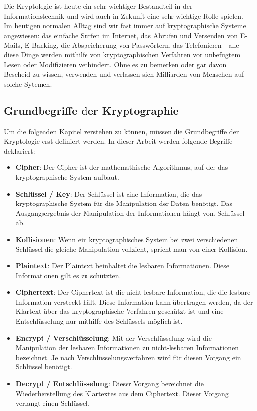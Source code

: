 \documentclass[12pt,a4paper]{report}
\begin{document}
\begin{onehalfspace}
Die Kryptologie ist heute ein sehr wichtiger Bestandteil in der Informationstechnik und wird auch in Zukunft eine sehr wichtige Rolle spielen. Im heutigen normalen Alltag sind wir fast immer auf kryptographische Systeme angewiesen: das einfache Surfen im Internet, das Abrufen und Versenden von E-Mails, E-Banking, die Abspeicherung von Passwörtern, das Telefonieren - alle diese Dinge werden mithilfe von kryptographischen Verfahren vor unbefugtem Lesen oder Modifizieren verhindert. Ohne es zu bemerken oder gar davon Bescheid zu wissen, verwenden und verlassen sich Milliarden von Menschen auf solche Sytemen.

\subsection{Grundbegriffe der Kryptographie}

Um die folgenden Kapitel verstehen zu können, müssen die Grundbegriffe der Kryptologie erst definiert werden. In dieser Arbeit werden folgende Begriffe deklariert:

\begin{itemize}
\item \textbf{Cipher}: Der Cipher ist der mathemathische Algorithmus, auf der das kryptographische System aufbaut.
\item \textbf{Schlüssel / Key}: Der Schlüssel ist eine Information, die das kryptographische System für die Manipulation der Daten benötigt. Das Ausgangsergebnis der Manipulation der Informationen hängt vom Schlüssel ab.
\item \textbf{Kollisionen}: Wenn ein kryptographisches System bei zwei verschiedenen Schlüssel die gleiche Manipulation vollzieht, spricht man von einer Kollision.
\item \textbf{Plaintext}: Der Plaintext beinhaltet die lesbaren Informationen. Diese Informationen gilt es zu schützten.
\item \textbf{Ciphertext}: Der Ciphertext ist die nicht-lesbare Information, die die lesbare Information versteckt hält. Diese Information kann übertragen werden, da der Klartext über das kryptographische Verfahren geschützt ist und eine Entschlüsselung nur mithilfe des Schlüssels möglich ist.
\item \textbf{Encrypt / Verschlüsselung}: Mit der Verschlüsselung wird die Manipulation der lesbaren Informationen zu nicht-lesbaren Informationen bezeichnet. Je nach Verschlüsselungsverfahren wird für diesen Vorgang ein Schlüssel benötigt.
\item \textbf{Decrypt / Entschlüsselung}: Dieser Vorgang bezeichnet die Wiederherstellung des Klartextes aus dem Ciphertext. Dieser Vorgang verlangt einen Schlüssel.
\end{itemize}


\end{onehalfspace}
\end{document}
